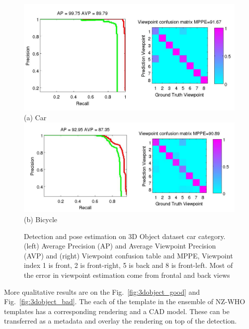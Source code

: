 \documentclass[10pt,twocolumn,letterpaper]{article}
\begin{document}
\begin{figure}[h]
  \centering
  \includegraphics[width=0.99\linewidth]{supp/car_ap_3dobject_tight.png}\\
  \vspace{-5pt}
  (a) Car\\
  \includegraphics[width=0.99\linewidth]{supp/bicycle_ap_3dobject_tight.png}\\
  \vspace{-5pt}
  (b) Bicycle
\caption{Detection and pose estimation on 3D Object dataset car category. (left) Average Precision (AP) and Average Viewpoint Precision (AVP) and (right) Viewpoint confusion table and MPPE, Viewpoint index 1 is front, 2 is front-right, 5 is back and 8 is front-left. Most of the error in viewpoint estimation come from frontal and back views}%
  \label{fig:3dobject_ap}
\end{figure}

More qualitative results are on the Fig.~\ref{fig:3dobject_good} and Fig.~\ref{fig:3dobject_bad}. The each of the template in the ensemble of NZ-WHO templates has a corresponding rendering and a CAD model. These can be transferred as a metadata and overlay the rendering on top of the detection.
\end{document}

